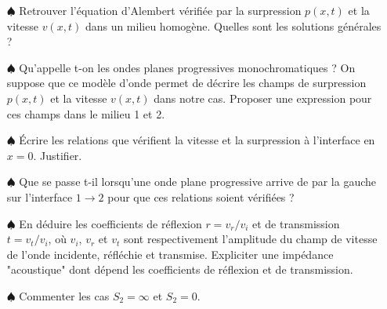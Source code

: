 \documentclass{report}
\begin{document}
\begin{itemize}
	
	\item[$\spadesuit$] Retrouver l'équation d'Alembert vérifiée par la surpression $p(x,t)$ et la vitesse $v(x,t)$ dans un milieu homogène. Quelles sont les solutions générales ? 
	
	\item[$\spadesuit$] Qu'appelle t-on les ondes planes progressives monochromatiques ? On suppose que ce modèle d'onde permet de décrire les champs de surpression $p(x,t)$ et la vitesse $v(x,t)$ dans notre cas. Proposer une expression pour ces champs dans le milieu 1 et 2.
	
	\item[$\spadesuit$] Écrire les relations que vérifient la vitesse et la surpression à l'interface en $x=0$. Justifier.
	
	\item[$\spadesuit$] Que se passe t-il lorsqu'une onde plane progressive arrive de par la gauche sur l'interface $1\longrightarrow2$ pour que ces relations soient vérifiées ?
	
	\item[$\spadesuit$] En déduire les coefficients de réflexion $r=v_r/v_i$ et de transmission $t=v_t/v_i$, où $v_i$, $v_r$ et $v_t$ sont respectivement l'amplitude du champ de vitesse de l'onde incidente, réfléchie et transmise. Expliciter une impédance "acoustique" dont dépend les coefficients de réflexion et de transmission.
	
	\item[$\spadesuit$] Commenter les cas $S_2=\infty$ et $S_2=0$.

\end{itemize}
\end{document}
